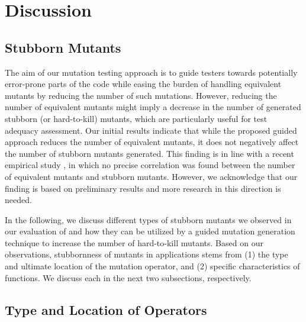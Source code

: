 \section{Discussion} \label{Sec:discussion}

\subsection{Stubborn Mutants}
The aim of our mutation testing approach is to guide testers towards potentially error-prone parts of the code while easing the burden of handling equivalent mutants by reducing the number of such mutations. However, reducing the number of equivalent mutants might imply a decrease in the number of generated stubborn (or hard-to-kill) mutants, which are particularly useful for test adequacy assessment. Our initial results indicate that while the proposed guided approach reduces the number of equivalent mutants, it does not negatively affect the number of stubborn mutants generated. This finding is in line with a recent empirical study \cite{yao:icse14}, in which  no precise correlation was found between the number of equivalent mutants and stubborn mutants. However, we acknowledge that our finding is based on  preliminary results and more research in this direction is needed. 

In the following, we discuss different types of stubborn mutants we observed in our evaluation of \mutandis and how they can be utilized by a guided mutation generation technique to increase the number of hard-to-kill mutants.
 Based on our observations, stubbornness of mutants in \javascript applications stems from (1) the type and ultimate location of the mutation operator, and (2) specific characteristics of \javascript functions. We discuss each in the next two subsections, respectively.

\subsection{Type and Location of Operators} 

